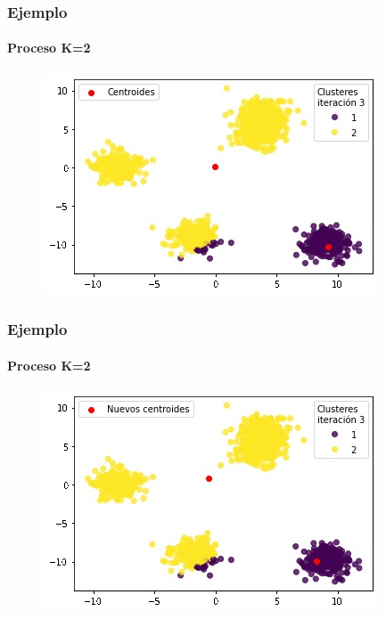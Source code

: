 \documentclass[
  shownotes,
  xcolor={svgnames},
  hyperref={colorlinks,citecolor=DarkBlue,linkcolor=DarkRed,urlcolor=DarkBlue}
  , aspectratio=169]{beamer}
\begin{document}
\begin{frame}
\frametitle{Ejemplo}
\framesubtitle{Proceso K=2}


\begin{figure}[H] \centering

    \centering
    \includegraphics[scale=.7]{figures/k2_3.jpg}
  \\
  \tiny
\end{figure}


\end{frame}
\begin{frame}
\frametitle{Ejemplo}
\framesubtitle{Proceso K=2}


\begin{figure}[H] \centering

    \centering
    \includegraphics[scale=.7]{figures/k2_4.jpg}
  \\
  \tiny
\end{figure}


\end{frame}
\end{document}
